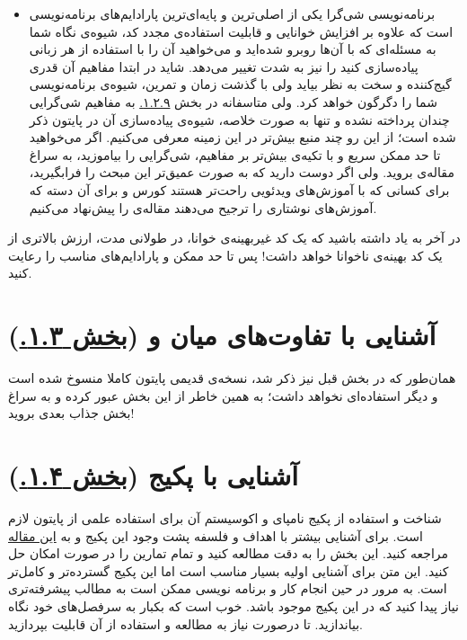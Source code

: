 \documentclass[11pt, a4paper]{article}
\begin{document}
\begin{itemize}[label=\Large $\bullet$]
  \item
  برنامه‌نویسی شی‌گرا یکی از اصلی‌ترین و پایه‌ای‌ترین پارادایم‌های برنامه‌نویسی است
  که علاوه بر افزایش خوانایی و قابلیت استفاده‌ی مجدد کد،
  شیوه‌ی نگاه شما به مسئله‌ای که با آن‌ها روبرو شده‌اید
  و می‌خواهید آن را با استفاده از هر زبانی پیاده‌سازی کنید را نیز به شدت تغییر می‌دهد.
  شاید در ابتدا مفاهیم آن قدری گیج‌کننده و سخت به نظر بیاید ولی با گذشت زمان و تمرین،
  شیوه‌ی برنامه‌نویسی شما را دگرگون خواهد کرد.
  ولی متاسفانه در بخش
  \href{https://scipy-lectures.org/intro/language/oop.html}{۱.۲.۹.}
  به مفاهیم شی‌گرایی چندان پرداخته نشده و تنها به صورت خلاصه، شیوه‌ی پیاده‌سازی‌ آن در پایتون ذکر شده است؛
  از این رو چند منبع بیش‌تر در این زمینه معرفی می‌کنیم.
  اگر می‌خواهید تا حد ممکن سریع و با تکیه‌ی بیش‌تر بر مفاهیم، شی‌گرایی را بیاموزید،
  به سراغ مقاله‌ی
  \href{https://towardsdatascience.com/understand-o-o-p-in-python-with-one-article-bfa76f3ba48c}{}
  بروید.
  ولی اگر دوست دارید که به صورت عمیق‌تر این مبحث را فرابگیرید،
  برای کسانی که با آموزش‌های ویدئویی راحت‌تر هستند کورس
  \href{https://learn.datacamp.com/courses/object-oriented-programming-in-python}{}
  و برای آن دسته که آموزش‌های نوشتاری را ترجیح می‌دهند مقاله‌ی
  \href{https://realpython.com/python3-object-oriented-programming/}{}
  را پیش‌نهاد می‌کنیم.
\end{itemize}

در آخر به یاد داشته باشید که یک کد غیربهینه‌ی خوانا،
در طولانی مدت،
ارزش بالاتری از یک کد بهینه‌ی ناخوانا خواهد داشت!
پس تا حد ممکن
و پارادایم‌های مناسب را رعایت کنید.


\section{آشنایی با تفاوت‌های میان  و  (\href{https://scipy-lectures.org/intro/python_2_python_3.html}{بخش ۱.۳.})}
همان‌طور که در بخش قبل نیز ذکر شد،
نسخه‌ی قدیمی پایتون کاملا منسوخ شده است و دیگر استفاده‌ای نخواهد داشت؛
به همین خاطر از این بخش عبور کرده و به سراغ بخش جذاب بعدی بروید!


\section{آشنایی با پکیج   (\href{https://scipy-lectures.org/intro/numpy/index.html}{بخش ۱.۴.})}

شناخت و استفاده از پکیج نامپای و اکوسیستم آن برای استفاده علمی از پایتون لازم است. 
برای آشنایی بیشتر با اهداف و فلسفه پشت وجود این پکیج و  به \href{https://www.nature.com/articles/s41586-020-2649-2}{این مقاله} مراجعه کنید.
این بخش را به دقت مطالعه کنید و تمام تمارین را در صورت امکان حل کنید.
این متن برای آشنایی اولیه بسیار مناسب است اما این پکیج گسترده‌تر و کامل‌تر است.
به مرور در حین انجام کار و برنامه نویسی ممکن است به مطالب پیشرفته‌تری نیاز پیدا کنید
 که در این پکیج موجود باشد. 
 خوب است که بکبار به سرفصل‌های خود  نگاه بیاندازید. 
 تا درصورت نیاز به مطالعه و استفاده از آن قابلیت بپردازید.
  
\end{document}
